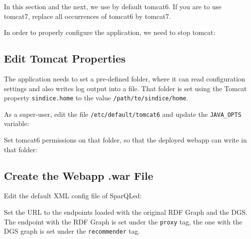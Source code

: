 
In this section and the next, we use by default tomcat6. If you are to use tomcat7, replace all occurrences of tomcat6 by tomcat7.

In order to properly configure the application, we need to stop tomcat:

\bigskip
\begin{raggedleft}
\end{raggedleft}

\subsection{Edit Tomcat Properties}

The application needs to set a pre-defined folder, where it can read configuration settings and also writes log output into a file. That folder is set using the Tomcat property \texttt{sindice.home} to the value \texttt{/path/to/sindice/home}.

As a super-user, edit the file \texttt{/etc/default/tomcat6} and update the \texttt{JAVA\_OPTS} variable:

\bigskip
\begin{raggedleft}
\end{raggedleft}
\hfill

Set tomcat6 permissions on that folder, so that the deployed webapp can write in that folder:

\bigskip
\begin{raggedleft}
\end{raggedleft}

\subsection{Create the Webapp .war File}

Edit the default XML config file of SparQLed:

\bigskip
\begin{raggedleft}
\end{raggedleft}

Set the URL to the endpoints loaded with the original RDF Graph and the DGS. The endpoint with the RDF Graph is set under the \texttt{proxy} tag, the one with the DGS graph is set under the \texttt{recommender} tag.

